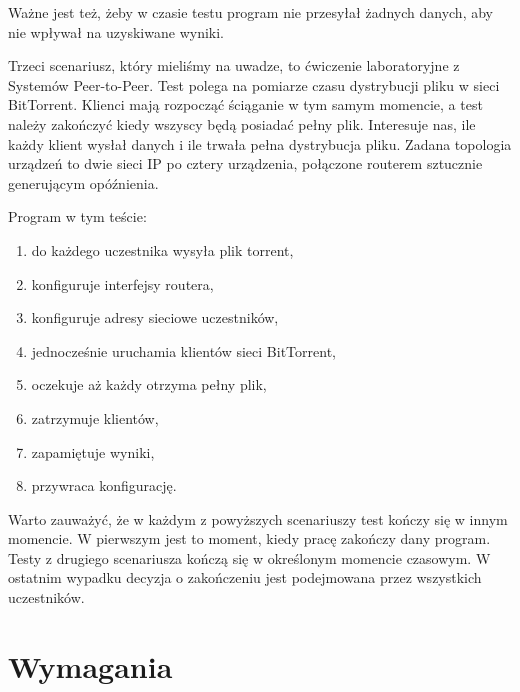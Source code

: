 \documentclass[00-praca-magisterska.tex]{subfiles}
\begin{document}
Ważne jest też, żeby w czasie testu program nie przesyłał żadnych danych, aby
nie wpływał na uzyskiwane wyniki.

Trzeci scenariusz, który mieliśmy na uwadze, to ćwiczenie laboratoryjne z
Systemów Peer-to-Peer. Test polega na pomiarze czasu dystrybucji pliku w sieci
BitTorrent. Klienci mają rozpocząć ściąganie w tym samym momencie, a test należy
zakończyć kiedy wszyscy będą posiadać pełny plik. Interesuje nas, ile każdy
klient wysłał danych i ile trwała pełna dystrybucja pliku. Zadana topologia
urządzeń to dwie sieci IP po cztery urządzenia, połączone routerem sztucznie
generującym opóźnienia.

Program w tym teście:
\begin{enumerate}
\item do każdego uczestnika wysyła plik torrent,
\item konfiguruje interfejsy routera,
\item konfiguruje adresy sieciowe uczestników,
\item jednocześnie uruchamia klientów sieci BitTorrent,
\item oczekuje aż każdy otrzyma pełny plik,
\item zatrzymuje klientów,
\item zapamiętuje wyniki,
\item przywraca konfigurację.
\end{enumerate}

Warto zauważyć, że w każdym z powyższych scenariuszy test kończy się w innym
momencie. W pierwszym jest to moment, kiedy pracę zakończy dany program. Testy
z drugiego scenariusza kończą się w określonym momencie czasowym. W ostatnim
wypadku decyzja o zakończeniu jest podejmowana przez wszystkich uczestników.

\section{Wymagania}
\end{document}
